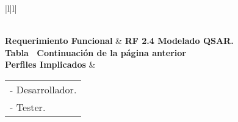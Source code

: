 \begin{longtable}{|l|l|}
\caption{Prueba unitaria RF2.4}
\label{PU_RF_2_4}\\
\hline
\textbf{Requerimiento Funcional}                                                        & \textbf{RF 2.4  Modelado QSAR.}                                                                                                                                                                                                                                                                                                                                                                                                                                                                                                                                                                                                                                                                                                                                                                        \\ \hline
\endfirsthead
%
%
{{\bfseries Tabla \thetable\ Continuación de la página anterior}} \\
\endhead
%
\textbf{Perfiles Implicados}                                                            & \begin{tabular}[c]{@{}l@{}}- Desarrollador.\\ - Tester.\end{tabular}                                                                                                                                                                                                                                                                                                                                                                                                                                                                                                                                                                                                                                                                                                                                   \\ \hline

\end{longtable}
